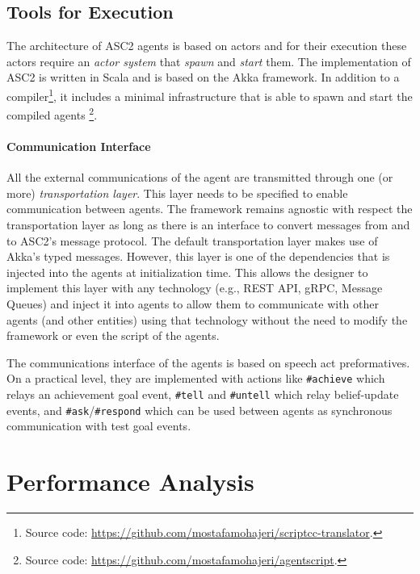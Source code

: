 \subsection{Tools for Execution}
The architecture of ASC2 agents is based on actors and for their execution these actors require an \textit{actor system} that \textit{spawn} and \textit{start} them. The implementation of ASC2 is written in Scala and is based on the Akka framework. In addition to a compiler\footnote{Source code: 
\url{https://github.com/mostafamohajeri/scriptcc-translator}.}, it includes a minimal infrastructure that is able to spawn and start the compiled agents%
\footnote{Source code: \url{https://github.com/mostafamohajeri/agentscript}.
}.

\paragraph{Communication Interface}
All the external communications of the agent are transmitted through one (or more) \textit{transportation layer}. This layer needs to be specified to enable communication between agents. The framework remains agnostic with respect the transportation layer as long as there is an interface to convert messages from and to ASC2's message protocol. The default transportation layer makes use of Akka's typed messages. However, this layer is one of the dependencies that is injected into the agents at initialization time. This allows the designer to implement this layer with any technology (e.g., REST API, gRPC, Message Queues) and inject it into agents to allow them to communicate with other agents (and other entities) using that technology without the need to modify the framework or even the script of the agents.

The communications interface of the agents is based on speech act preformatives. On a practical level, they are implemented with actions like \texttt{#achieve} which relays an achievement goal event, \texttt{#tell} and \texttt{#untell} which relay belief-update events, and \texttt{#ask}/\texttt{#respond} which can be used between agents as synchronous communication with test goal events.


\section{Performance Analysis}
\label{sec_bench}

